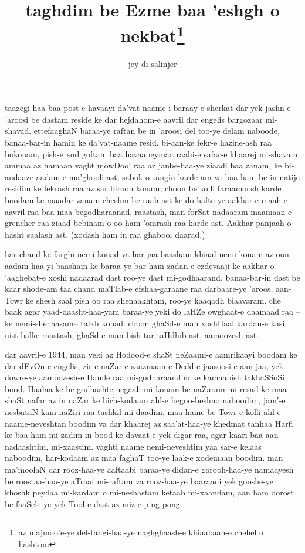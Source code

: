 \documentclass{article}
\title{taghdim be Ezme baa 'eshgh o nekbat\footnote{%
	az majmoo'e-ye del-tangi-haa-ye naghghaash-e
	khiaabaan-e chehel o hashtom}%
}
\author{jey di salinjer}
\date{}
\begin{document}
\maketitle

taazegi-haa baa post-e havaayi da'vat-naame-i baraay-e sherkat dar yek
jashn-e 'aroosi be dastam reside ke dar hejdahom-e aavril dar engelis
bargozaar mi-shavad.  ettefaaghaN baraa-ye raftan be in 'aroosi del too-ye
delam naboode, banaa-bar-in hamin ke da'vat-naame resid,
bi-aan-ke fekr-e hazine-ash raa bokonam, pish-e xod goftam baa havaapeymaa
raahi-e safar-e khaarej mi-shavam.  ammaa az hamaan vaght mowDoo' raa az
janbe-haa-ye ziaadi baa zanam, ke bi-andaaze aadam-e ma'ghooli ast, sabok
o sangin karde-am va baa ham be in natije residim ke fekrash raa az sar
biroon konam, choon be kolli faraamoosh karde boodam ke maadar-zanam cheshm
be raah ast ke do hafte-ye aakhar-e maah-e aavril raa baa maa begodharaanad.
raastash, man forSat nadaaram maamaan-e grencher raa ziaad bebinam o oo ham
'omrash raa karde ast.  Aakhar panjaah o hasht saalash ast. (xodash ham
in raa ghabool daarad.)

har-chand ke farghi nemi-konad va har jaa baasham khiaal nemi-konam az oon
aadam-haa-yi baasham ke baraa-ye bar-ham-zadan-e ezdevaaji ke aakhar o
'aaghebat-e xoshi nadaarad dast roo-ye dast mi-godhaarand.  banaa-bar-in dast
be kaar shode-am taa chand maTlab-e efshaa-garaane raa darbaare-ye 'aroos,
aan-Towr ke shesh saal pish oo raa shenaakhtam, roo-ye kaaqadh biaavaram. 
che baak agar yaad-daasht-haa-yam baraa-ye yeki do laHZe owghaat-e daamaad
raa --ke nemi-shenaasam-- talkh konad.  choon ghaSd-e man xoshHaal kardan-e
kasi nist balke raastash, ghaSd-e man bish-tar taHdhib ast, aamoozesh ast.

dar aavril-e 1944, man yeki az Hodood-e shaSt neZaami-e aamrikaayi boodam
ke dar dEvOn-e engelis, zir-e naZar-e saazmaan-e Dedd-e-jaasoosi-e aan-jaa,
yek dowre-ye aamoozesh-e Hamle raa mi-godharaandim ke kamaabish takhaSSoSi
bood.  Haalaa ke be godhashte negaah mi-konam be naZaram mi-resad ke maa shaSt
nafar az in naZar ke hich-kodaam ahl-e begoo-beshno naboodim, jam'-e nesbataN
kam-naZiri raa tashkil mi-daadim.  maa hame be Towr-e kolli ahl-e
naame-neveshtan boodim va dar khaarej az saa'at-haa-ye khedmat tanhaa Harfi
ke baa ham mi-zadim in bood ke davaat-e yek-digar raa, agar kaari baa aan
nadaashtim, mi-xaastim.  vaghti naame nemi-neveshtim yaa sar-e kelaas
naboodim, har-kodaam az maa faghaT too-ye laak-e xodemaan boodim.  man
ma'moolaN dar rooz-haa-ye aaftaabi baraa-ye didan-e gorooh-haa-ye namaayesh be
roostaa-haa-ye aTraaf mi-raftam va rooz-haa-ye baaraani yek gooshe-ye khoshk
peydaa mi-kardam o mi-neshastam ketaab mi-xaandam, aan ham dorost be
faaSele-ye yek Tool-e dast az miz-e ping-pong.
\end{document}

